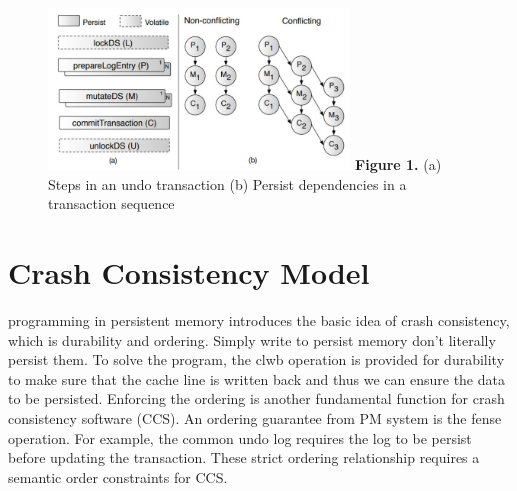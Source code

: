 \documentclass{sig-alternate}
\begin{document}
\begin{figure}
\includegraphics[width=8cm]{pmmodel}
\textbf{Figure 1.} (a) Steps in an undo transaction (b) Persist dependencies in a transaction sequence 
\end{figure}

\section{Crash Consistency Model}

programming in persistent memory introduces the basic idea of crash consistency, which is durability and ordering. Simply write to persist memory don't literally persist them. To solve the program, the clwb operation is provided for durability to make sure that the cache line is written back and thus we can ensure the data to be persisted. Enforcing the ordering is another fundamental function for crash consistency software (CCS). An ordering guarantee from PM system is the fense operation. For example, the common undo log requires the log to be persist before updating the transaction. These strict ordering relationship requires a semantic order constraints for CCS.
\end{document}
